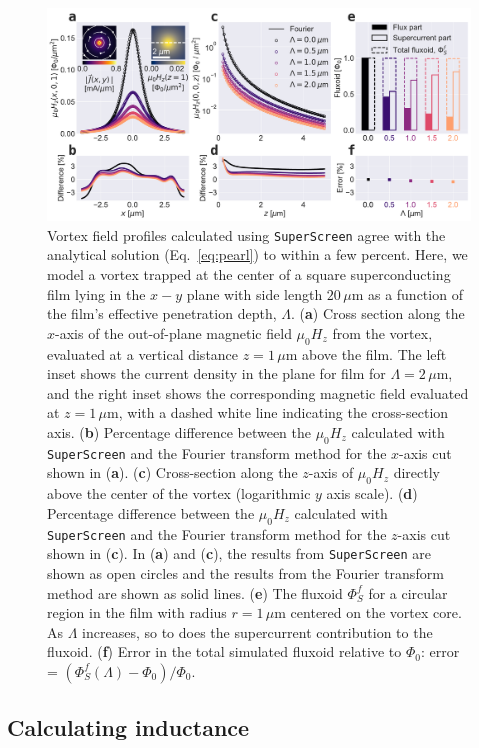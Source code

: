 \documentclass[final,3p,times,twocolumn]{elsarticle}
\newcommand{\inline}[1]{\texttt{#1}\xspace}
\newcommand{\SuperScreen}{\inline{SuperScreen}}
\newcommand{\um}{\mu\mathrm{m}}
\begin{document}
\begin{figure}[h!]
    \centering
    \includegraphics[width=\textwidth]{examples/images/pearl.pdf}
    \caption{Vortex field profiles calculated using \SuperScreen agree with the analytical solution (Eq.~\ref{eq:pearl}) to within a few percent. Here, we model a vortex trapped at the center of a square superconducting film lying in the $x-y$ plane with side length $20\,\um$ as a function of the film's effective penetration depth, $\Lambda$. ({\bf a}) Cross section along the $x$-axis of the out-of-plane magnetic field $\mu_0H_z$ from the vortex, evaluated at a vertical distance $z=1\,\um$ above the film. The left inset shows the current density in the plane for film for $\Lambda=2\,\um$, and the right inset shows the corresponding magnetic field evaluated at $z=1\,\um$, with a dashed white line indicating the cross-section axis. ({\bf b}) Percentage difference between the $\mu_0H_z$ calculated with \SuperScreen and the Fourier transform method for the $x$-axis cut shown in ({\bf a}). ({\bf c}) Cross-section along the $z$-axis of $\mu_0H_z$ directly above the center of the vortex (logarithmic $y$ axis scale). ({\bf d}) Percentage difference between the $\mu_0H_z$ calculated with \SuperScreen and the Fourier transform method for the $z$-axis cut shown in ({\bf c}). In ({\bf a}) and ({\bf c}), the results from \SuperScreen are shown as open circles and the results from the Fourier transform method are shown as solid lines. ({\bf e}) The fluxoid $\Phi_S^f$ for a circular region in the film with radius $r=1\,\um$ centered on the vortex core. As $\Lambda$ increases, so to does the supercurrent contribution to the fluxoid. ({\bf f}) Error in the total simulated fluxoid relative to $\Phi_0$: error = $(\Phi_S^f(\Lambda) - \Phi_0) / \Phi_0$.}
    \label{fig:pearl}
\end{figure}

\subsection{Calculating inductance}
\label{section:examples:inductance}
\end{document}
